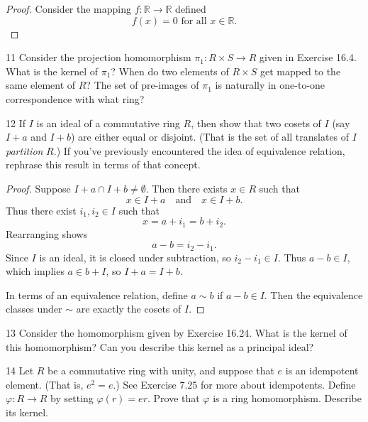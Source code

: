 \begin{proof}
    Consider the mapping $f : \mathbb{R} \longrightarrow \mathbb{R}$ defined 
    \[f(x) = 0 \text{ for all } x \in \mathbb{R}.\]
\end{proof}

\begin{problem}{11}
    Consider the projection homomorphism $\pi_1 : R \times S \to R$ given in
    Exercise 16.4. What is the kernel of $\pi_1$? When do two elements of $R \times S$ get
    mapped to the same element of $R$? The set of pre-images of $\pi_1$ is naturally in
    one-to-one correspondence with what ring?
\end{problem}
\unsolved

\begin{problem}{12}
    If $I$ is an ideal of a commutative ring $R$, then show that two cosets of $I$
    (say $I + a$ and $I + b$) are either equal or disjoint. (That is the 
    set of all translates of $I$ \emph{partition} $R$.) If you've previously 
    encountered the idea of equivalence relation, rephrase this result in terms of that concept.
\end{problem}
\solved

\begin{proof}
    Suppose $I+a \cap I+b \neq \emptyset$. Then there exists $x \in R$ such that
    \[
        x \in I+a \quad \text{and} \quad x \in I+b.
    \]
    Thus there exist $i_1, i_2 \in I$ such that
    \[
        x = a + i_1 = b + i_2.
    \]
    Rearranging shows
    \[
        a - b = i_2 - i_1.
    \]
    Since $I$ is an ideal, it is closed under subtraction, so $i_2 - i_1 \in I$.
    Thus $a - b \in I$, which implies $a \in b + I$, so $I+a = I+b$.

    In terms of an equivalence relation, define $a \sim b$ if $a-b \in I$.
    Then the equivalence classes under $\sim$ are exactly the cosets of $I$.
\end{proof}

\begin{problem}{13}
    Consider the homomorphism given by Exercise 16.24. What is the kernel of this
    homomorphism? Can you describe this kernel as a principal ideal?
\end{problem}
\unsolved

\begin{problem}{14}
    Let $R$ be a commutative ring with unity, and suppose that $e$ is an idempotent
    element. (That is, $e^2 = e$.) See Exercise 7.25 for more about idempotents. Define
    $\varphi : R \to R$ by setting $\varphi(r) = er$. Prove that $\varphi$ is a ring
    homomorphism. Describe its kernel.
\end{problem}
\unsolved

